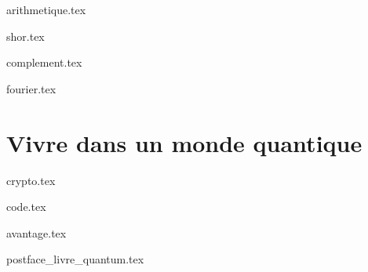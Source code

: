 \documentclass[11pt]{report}
\begin{document}
{arithmetique.tex}

{shor.tex}

{complement.tex}

{fourier.tex}


\part{Vivre dans un monde quantique}

{crypto.tex}

{code.tex}

{avantage.tex}


\clearemptydoublepage



{postface_livre_quantum.tex}

\vfill
\bigskip
\bigskip

\end{document}
